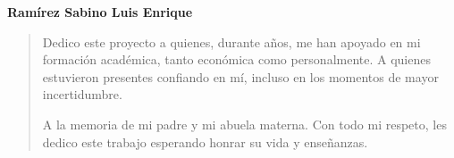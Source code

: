 \noindent \textbf{Ramírez Sabino Luis Enrique}
\begin{quote}
    Dedico este proyecto a quienes, durante años, me han apoyado en mi formación académica, tanto económica como personalmente. A quienes estuvieron presentes confiando en mí, incluso en los momentos de mayor incertidumbre.
    
    A la memoria de mi padre y mi abuela materna. Con todo mi respeto, les dedico este trabajo esperando honrar su vida y enseñanzas.
\end{quote}

\clearpage
